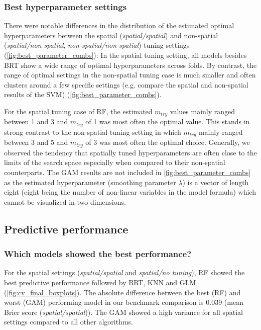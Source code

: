 \documentclass[review]{elsarticle}
\begin{document}
\subsubsection{Best hyperparameter settings}
There were notable differences in the distribution of the estimated optimal hyperparameters between the spatial (\emph{spatial/spatial}) and non-spatial (\emph{spatial/non-spatial}, \emph{non-spatial/non-spatial}) tuning settings (\autoref{fig:best_parameter_combs}): In the spatial tuning setting, all models besides BRT show a wide range of optimal hyperparameters across folds.
By contrast, the range of optimal settings in the non-spatial tuning case is much smaller and often clusters around a few specific settings (e.g. compare the spatial and non-spatial results of the SVM) (\autoref{fig:best_parameter_combs}).

For the spatial tuning case of RF, the estimated \texttt{$m_{try}$} values mainly ranged between 1 and 3 and \texttt{$m_{try}$} of 1 was most often the optimal value.
This stands in strong contrast to the non-spatial tuning setting in which \texttt{$m_{try}$} mainly ranged between 3 and 5 and \texttt{$m_{try}$} of 3 was most often the optimal choice.
Generally, we observed the tendency that spatially tuned hyperparameters are often close to the limits of the search space especially when compared to their non-spatial counterparts.
The GAM results are not included in \autoref{fig:best_parameter_combs} as the estimated hyperparameter (smoothing parameter $\lambda$) is a vector of length eight (eight being the number of non-linear variables in the model formula) which cannot be visualized in two dimensions.

\subsection{Predictive performance}
\label{subsec:pred_perf}

\subsubsection{Which models showed the best performance?}
For the spatial settings (\emph{spatial/spatial} and \emph{spatial/no tuning}), \ac{RF} showed the best predictive performance followed by BRT, KNN and GLM (\autoref{fig:cv_final_boxplots}).
The absolute difference between the best (RF) and worst (GAM) performing model in our benchmark comparison is 0.039 (mean Brier score (\emph{spatial/spatial})).
The GAM showed a high variance for all spatial settings compared to all other algorithms.
\end{document}
